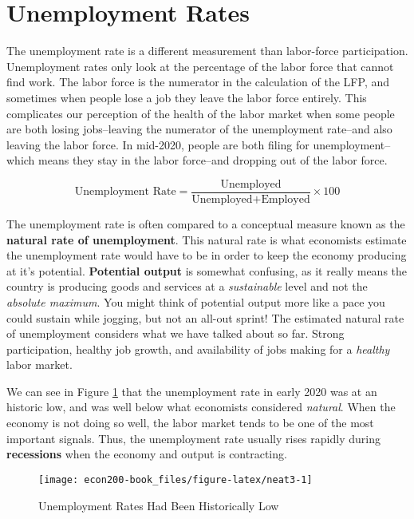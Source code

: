 \documentclass[
]{book}
\begin{document}
\hypertarget{unemployment-rates}{%
\section{Unemployment Rates}\label{unemployment-rates}}

The unemployment rate is a different measurement than labor-force participation. Unemployment rates only look at the percentage of the labor force that cannot find work. The labor force is the numerator in the calculation of the LFP, and sometimes when people lose a job they leave the labor force entirely. This complicates our perception of the health of the labor market when some people are both losing jobs--leaving the numerator of the unemployment rate--and also leaving the labor force. In mid-2020, people are both filing for unemployment--which means they stay in the labor force--and dropping out of the labor force.

\[ \text{Unemployment Rate} = \frac{\text{Unemployed}}{\text{Unemployed} + \text{Employed}} \times 100 \]

The unemployment rate is often compared to a conceptual measure known as the \textbf{natural rate of unemployment}. This natural rate is what economists estimate the unemployment rate would have to be in order to keep the economy producing at it's potential. \textbf{Potential output} is somewhat confusing, as it really means the country is producing goods and services at a \emph{sustainable} level and not the \emph{absolute maximum}. You might think of potential output more like a pace you could sustain while jogging, but not an all-out sprint! The estimated natural rate of unemployment considers what we have talked about so far. Strong participation, healthy job growth, and availability of jobs making for a \emph{healthy} labor market.

We can see in Figure \ref{fig:neat3} that the unemployment rate in early 2020 was at an historic low, and was well below what economists considered \emph{natural}. When the economy is not doing so well, the labor market tends to be one of the most important signals. Thus, the unemployment rate usually rises rapidly during \textbf{recessions} when the economy and output is contracting.

\begin{figure}

{\centering \texttt{[image: econ200-book\_files/figure-latex/neat3-1]} 

}

\caption{Unemployment Rates Had Been Historically Low}\label{fig:neat3}
\end{figure}
\end{document}
